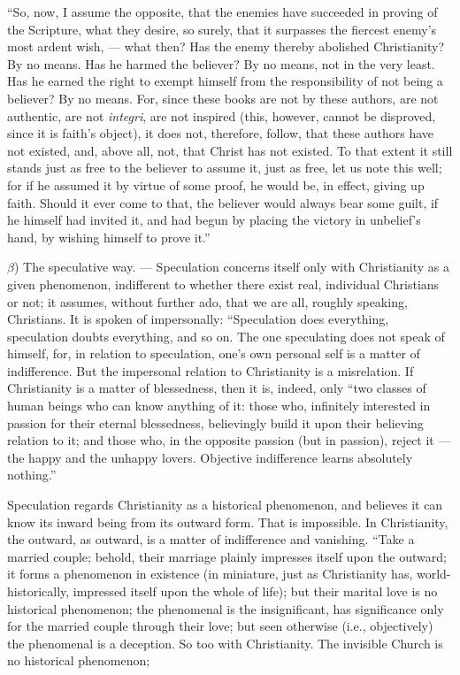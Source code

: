 \documentclass[12pt]{book}
\begin{document}
``So, now, I assume the opposite, that the enemies have succeeded in proving of the Scripture, what they desire, so surely, that it surpasses the fiercest enemy's most ardent wish, --- what then? Has the enemy thereby abolished Christianity? By no means. Has he harmed the believer? By no means, not in the very least. Has he earned the right to exempt himself from the responsibility of not being a believer? By no means. For, since these books are not by these authors, are not authentic, are not \textit{integri}, are not inspired (this, however, cannot be disproved, since it is faith's object), it does not, therefore, follow, that these authors have not existed, and, above all, not, that Christ has not existed. To that extent it still stands just as free to the believer to assume it, just as free, let us note this well; for if he assumed it by virtue of some proof, he would be, in effect, giving up faith. Should it ever come to that, the believer would always bear some guilt, if he himself had invited it, and had begun by placing the victory in unbelief's hand, by wishing himself to prove it.''

$\beta$) The speculative way. --- Speculation concerns itself only with Christianity as a given phenomenon,
indifferent to whether there exist real, individual Christians or not; it assumes, without further ado, that we are all, roughly speaking, Christians. It is spoken of impersonally: ``Speculation does everything, speculation doubts everything, and so on. The one speculating does not speak of himself, for, in relation to speculation, one's own personal self is a matter of indifference. But the impersonal relation to Christianity is a misrelation. If Christianity is a matter of blessedness, then it is, indeed, only ``two classes of human beings who can know anything of it: those who, infinitely interested in passion for their eternal blessedness, believingly build it upon their believing relation to it; and those who, in the opposite passion (but in passion), reject it --- the happy and the unhappy lovers. Objective indifference learns absolutely nothing.''

Speculation regards Christianity as a historical phenomenon, and believes it can know its inward being from its outward form. That is impossible. In Christianity, the outward, as outward, is a matter of indifference and vanishing. ``Take a married couple; behold, their marriage plainly impresses itself upon the outward; it forms a phenomenon in existence (in miniature, just as Christianity has, world-historically, impressed itself upon the whole of life); but their marital love is no historical phenomenon; the phenomenal is the insignificant, has significance only for the married couple through their love; but seen otherwise (i.e., objectively) the phenomenal is a deception. So too with Christianity. The invisible Church is no historical phenomenon;
\end{document}
